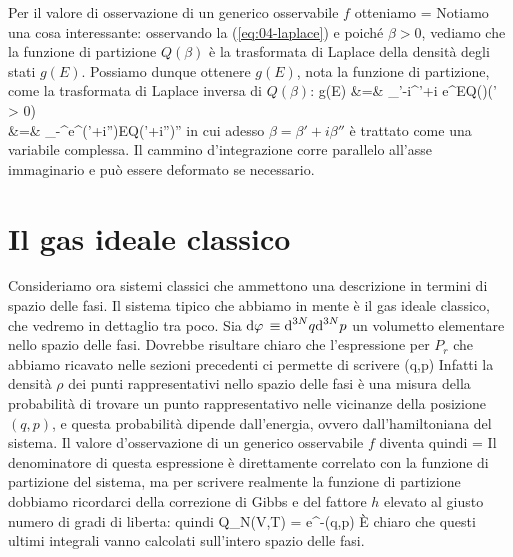 \ee
Per il valore di osservazione di un generico osservabile $f$ otteniamo
\be
{} = 
\ee
Notiamo una cosa interessante: osservando la (\ref{eq:04-laplace}) e poiché $\beta > 0$, vediamo che la funzione di partizione $Q(\beta)$ è la trasformata di Laplace della densità degli stati $g(E)$. Possiamo dunque ottenere $g(E)$, nota la funzione di partizione, come la trasformata di Laplace inversa di $Q(\beta)$:
\bea 
\label{eq:04-gfromq}
g(E) &=& \int_{\beta'-i\infty}^{\beta'+i\infty} e^{\beta E}Q(\beta)\de\beta\quad(\beta' > 0)
\nonumber \\
&=& \int_{-\infty}^{\infty}e^{(\beta'+i\beta'')E}Q(\beta'+i\beta'')\de\beta''
\eea
in cui adesso $\beta = \beta' + i\beta''$ è trattato come una variabile complessa. Il cammino d'integrazione corre parallelo all'asse immaginario e può essere deformato se necessario.

\section{Il gas ideale classico}
\label{sec:04-gas-ideale}

Consideriamo ora sistemi classici che ammettono una descrizione in termini di spazio delle fasi. Il sistema tipico che abbiamo in mente è il gas ideale classico, che vedremo in dettaglio tra poco. Sia ${\textrm d}\varphi\, \equiv {\textrm d}^{3N}q{\textrm d}^{3N}p$ un volumetto elementare nello spazio delle fasi. Dovrebbe risultare chiaro che l'espressione per $P_r$ che abbiamo ricavato nelle sezioni precedenti ci permette di scrivere
\be
\rho(q,p) \propto {}
\ee
Infatti la densità $\rho$ dei punti rappresentativi nello spazio delle fasi è una misura della probabilità di trovare un punto rappresentativo nelle vicinanze della posizione $(q,p)$, e questa probabilità dipende dall'energia, ovvero dall'hamiltoniana del sistema. Il valore d'osservazione di un generico osservabile $f$ diventa quindi
\be
{} = 
\ee
Il denominatore di questa espressione è direttamente correlato con la funzione di partizione del sistema, ma per scrivere realmente la funzione di partizione dobbiamo ricordarci della correzione di Gibbs e del fattore $h$ elevato al giusto numero di gradi di liberta: quindi
\be
Q_N(V,T) = \int e^{-\beta\Ham(q,p)}\dephi
\ee
\`E chiaro che questi ultimi integrali vanno calcolati sull'intero spazio delle fasi.


